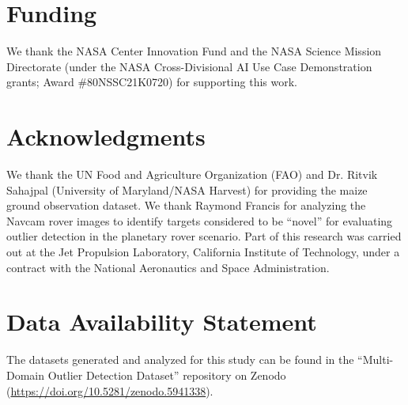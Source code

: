 \documentclass[utf8]{frontiersFPHY} %
\begin{document}
\section*{Funding}
We thank the NASA Center Innovation Fund 
and the NASA Science Mission Directorate 
(under the NASA Cross-Divisional AI Use Case Demonstration grants;
Award \#80NSSC21K0720) for supporting this work. 

\section*{Acknowledgments}
We thank the UN Food and Agriculture Organization (FAO) and Dr. Ritvik Sahajpal
(University of Maryland/NASA Harvest) for providing the maize ground
 observation dataset. 
%
We thank Raymond Francis for analyzing the Navcam 
rover images to identify targets considered to be ``novel'' for evaluating
outlier detection in the planetary rover scenario.
%
Part of this research was carried out at the Jet Propulsion
Laboratory, California Institute of Technology, under a contract with
the National Aeronautics and Space Administration.




\section*{Data Availability Statement}
The datasets generated and analyzed for this study can be found in the
``Multi-Domain Outlier Detection Dataset'' repository on Zenodo 
(\url{https://doi.org/10.5281/zenodo.5941338}). 
\end{document}
